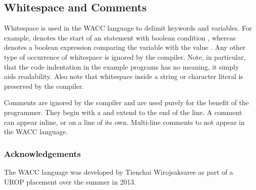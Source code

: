 \documentclass[a4paper]{article}
\theoremstyle{definition}
\begin{document}
\subsection{Whitespace and Comments}
Whitespace is used in the WACC language to delimit keywords and variables.
For example,  denotes the start of an  statement with boolean condition ,
whereas  denotes a boolean expression comparing the variable  with the value .
Any other type of occurrence of whitespace is ignored by the compiler.
Note, in particular, that the code indentation in the example programs has no meaning, it simply aids readability.
Also note that whitespace inside a string or character literal is preserved by the compiler.

Comments are ignored by the compiler and are used purely for the benefit of the programmer. They begin with a \lit{\#} and extend to the end of the line. A comment can appear inline, or on a line of its own. Multi-line comments to not appear in the WACC language.


\subsubsection*{Acknowledgements}
The WACC language was developed by Tienchai Wirojsaksaree as part of a UROP placement over the summer in 2013.

\end{document}
